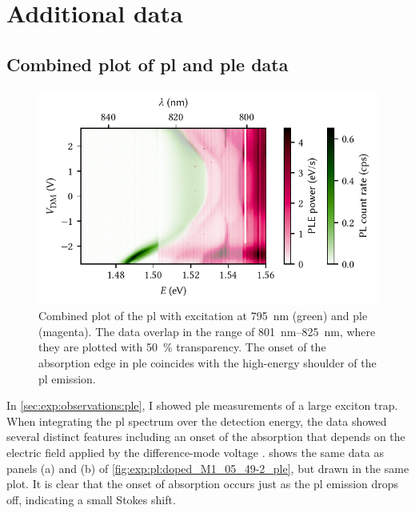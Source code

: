\section{Additional data}\label{sec:app:exp:observations:meas}
\subsection{Combined plot of \texorpdfstring{\acrshort{pl}}{PL} and \texorpdfstring{\acrshort{ple}}{PLE} data}\label{subsec:app:exp:observations:meas:pl_ple}
\begin{figure}
    \centering
    \includegraphics{img/pdf/experiment/doped_M1_05_49-2_ple_single}
    \caption[
        \protect\newline
    ]{
        Combined plot of the \gls{pl} with excitation at \qty{795}{\nano\meter} (green) and \gls{ple} (magenta).
        The data overlap in the range of \qtyrange{801}{825}{\nano\meter}, where they are plotted with \qty{50}{\percent} transparency.
        The onset of the absorption edge in \gls{ple} coincides with the high-energy shoulder of the \gls{pl} emission.
    }
    \label{fig:app:exp:pl:doped_M1_05_49-2_ple}
\end{figure}

In \cref{sec:exp:observations:ple}, I showed \gls{ple} measurements of a large exciton trap.
When integrating the \gls{pl} spectrum over the detection energy, the data showed several distinct features including an onset of the absorption that depends on the electric field applied by the difference-mode voltage \VDM.
 shows the same data as panels (a) and (b) of \cref{fig:exp:pl:doped_M1_05_49-2_ple}, but drawn in the same plot.
It is clear that the onset of absorption occurs just as the \gls{pl} emission drops off, indicating a small Stokes shift.

